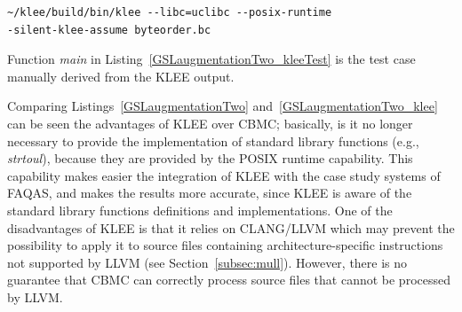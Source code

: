 \begin{verbatim}
~/klee/build/bin/klee --libc=uclibc --posix-runtime 
-silent-klee-assume byteorder.bc
\end{verbatim}


Function \emph{main} in Listing~\ref{GSLaugmentationTwo_kleeTest} is the test case manually derived from the KLEE output.

Comparing Listings~\ref{GSLaugmentationTwo} and~\ref{GSLaugmentationTwo_klee} can be seen the advantages of KLEE over CBMC; basically, is it no longer necessary to provide the implementation of standard library functions (e.g., \emph{strtoul}), because they are provided by the POSIX runtime capability. This capability makes easier the integration of KLEE with the case study systems of FAQAS, and makes the results more accurate, since KLEE is aware of the standard library functions definitions and implementations. One of the disadvantages of KLEE is that it relies on CLANG/LLVM which may prevent the possibility to apply it to source files containing architecture-specific instructions not supported by LLVM (see Section~\ref{subsec:mull}). However, there is no guarantee that CBMC can correctly process source files that cannot be processed by LLVM.

